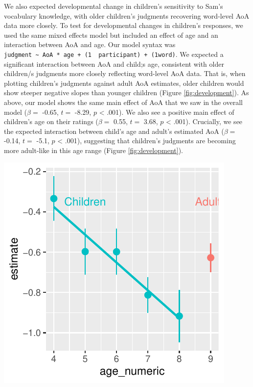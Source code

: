 \documentclass[10pt, letterpaper]{article}
\newenvironment{CodeChunk}{}{}
\begin{document}
We also expected developmental change in children's sensitivity to Sam's
vocabulary knowledge, with older children's judgments recovering
word-level AoA data more closely. To test for developmental changes in
children's responses, we used the same mixed effects model but included
an effect of age and an interaction between AoA and age. Our model
syntax was
\texttt{judgment\ \textasciitilde{}\ AoA\ *\ age\ +\ (1\ \textbar{}\ participant)\ +\ (1\textbar{}word)}.
We expected a significant interaction between AoA and child;s age,
consistent with older children/s judgments more closely reflecting
word-level AoA data. That is, when plotting children's judgments against
adult AoA estimates, older children would show steeper negative slopes
than younger children (Figure \ref{fig:development}). As above, our
model shows the same main effect of AoA that we saw in the overall model
(\(\beta =\) -0.65, \(t =\) -8.29, \(p\) \textless{} .001). We also see
a positive main effect of children's age on their ratings (\(\beta =\)
0.55, \(t =\) 3.68, \(p\) \textless{} .001). Crucially, we see the
expected interaction between child's age and adult's estimated AoA
(\(\beta =\) -0.14, \(t =\) -5.1, \(p\) \textless{} .001), suggesting
that children's judgments are becoming more adult-like in this age range
(Figure \ref{fig:development}).

\begin{CodeChunk}

\includegraphics{figs/unnamed-chunk-6-1} \end{CodeChunk}
\end{document}
